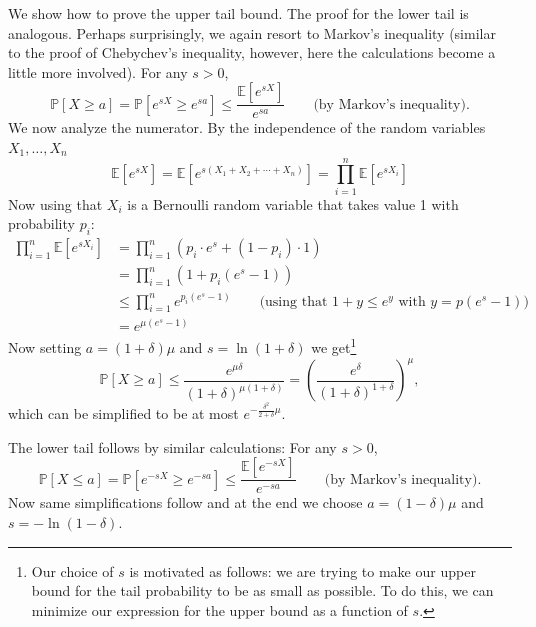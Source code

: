 We show how to prove the upper tail bound. The proof for the lower tail is analogous. Perhaps surprisingly, we again resort to Markov's inequality (similar to the proof of Chebychev's inequality, however, here the calculations become a little more involved). For any $s>0$,
\[
  \mathbb{P}[X\ge a]=\mathbb{P}\left[e^{sX}\ge e^{sa}\right]\le\frac{\mathbb{E}\left[e^{sX}\right]}{e^{sa}}\qquad\text{(by Markov's inequality).}
\]
We now analyze the numerator. By the independence of the random variables $X_1,\ldots,X_n$
\[
  \mathbb{E}\left[e^{sX}\right]=\mathbb{E}\left[e^{s(X_1+X_2+\cdots+X_n)}\right]=\prod_{i=1}^n\mathbb{E}\left[e^{sX_i}\right]
\]
Now using that $X_i$ is a Bernoulli random variable that takes value 1 with probability $p_i$:
\begin{align*}
  \prod_{i=1}^n\mathbb{E}\left[e^{sX_i}\right]
  &= \prod_{i=1}^n\left(p_i\cdot e^s+(1-p_i)\cdot 1\right)\\
  &= \prod_{i=1}^n\left(1+p_i(e^s-1)\right)\\
  &\le \prod_{i=1}^n e^{p_i(e^s-1)}\qquad\text{(using that $1+y\le e^y$ with $y=p(e^s-1)$)}\\
  &= e^{\mu(e^s-1)}
\end{align*}
Now setting $a=(1+\delta)\mu$ and $s=\ln(1+\delta)$ we get\footnote{Our choice of $s$ is motivated as follows: we are trying to make our upper bound for the tail probability to be as small as possible. To do this, we can minimize our expression for the upper bound as a function of $s$.}
\[
  \mathbb{P}[X\ge a]\le\frac{e^{\mu\delta}}{(1+\delta)^{\mu(1+\delta)}}=\left(\frac{e^{\delta}}{(1+\delta)^{1+\delta}}\right)^{\mu},
\]
which can be simplified to be at most $e^{-\frac{\delta^2}{2+\delta}\mu}$.

The lower tail follows by similar calculations: For any $s>0$,
\[
  \mathbb{P}[X\le a]=\mathbb{P}\left[e^{-sX}\ge e^{-sa}\right]\le\frac{\mathbb{E}\left[e^{-sX}\right]}{e^{-sa}}\qquad\text{(by Markov's inequality).}
\]
Now same simplifications follow and at the end we choose $a=(1-\delta)\mu$ and $s=-\ln(1-\delta)$.

% 
